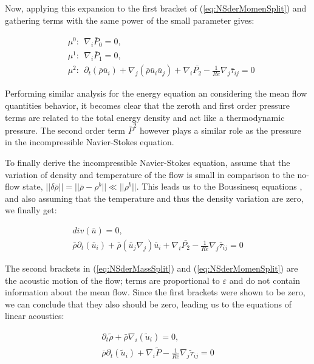 Now, applying this expansion to the first bracket of (\ref{eq:NSderMomenSplit}) and gathering terms with the same power of the small parameter gives:

\begin{subequations}
\begin{flalign}
    &\mu^0: \ \ \nabla_i \bar{P}_0 = 0, \\&
    \mu^1: \ \ \nabla_i \bar{P}_1 = 0, \\&
    \mu^2: \ \ \partial_t  (\bar{\rho} \bar{u}_i) + \nabla_j (\bar{\rho} \bar{u}_i\bar{u}_j) + \nabla_i \bar{P_2} - \frac{1}{Re} \nabla_j \bar{\tau}_{ij} = 0
\end{flalign}
\end{subequations}

Performing similar analysis for the energy equation an considering the mean flow quantities behavior, it becomes clear that the zeroth and first order pressure terms are related to the total energy density and act like a thermodynamic pressure. The second order term $\bar{P}^2$ however plays a similar role as the pressure in the incompressible Navier-Stokes equation.

To finally derive the incompressible Navier-Stokes equation, assume that the variation of density and temperature of the flow is small in comparison to the no-flow state, $||\delta \bar{\rho}|| = ||\bar{\rho} - \rho^b|| \ll || \rho^b ||$. This leads us to the Boussinesq equations \cite{Rehm}, and also assuming that the temperature and thus the density variation are zero, we finally get:

\begin{subequations}
\begin{align}
        div(\bar{u}) = 0, \\
        \bar{\rho} \partial_t  (\bar{u}_i) + \bar{\rho} (\bar{u}_j \nabla_j)\bar{u}_i + \nabla_i \bar{P_2} - \frac{1}{Re} \nabla_j \bar{\tau}_{ij} = 0
\end{align}
\end{subequations}

The second brackets in (\ref{eq:NSderMassSplit}) and (\ref{eq:NSderMomenSplit}) are the acoustic motion of the flow; terms are proportional to $\varepsilon$ and do not contain information about the mean flow. Since the first brackets were shown to be zero, we can conclude that they also should be zero, leading us to the equations of linear acoustics:

\begin{subequations}
\label{eq:acousticT}
\begin{align}
        \partial_t  \tilde{\rho} + \bar{\rho}  \nabla_i (\tilde{u}_i) = 0, \\
        \bar{\rho} \partial_t (\tilde{u}_i) + \nabla_i \tilde{P} - \frac{1}{Re} \nabla_j \tilde{\tau}_{ij} = 0
\end{align}
\end{subequations}

